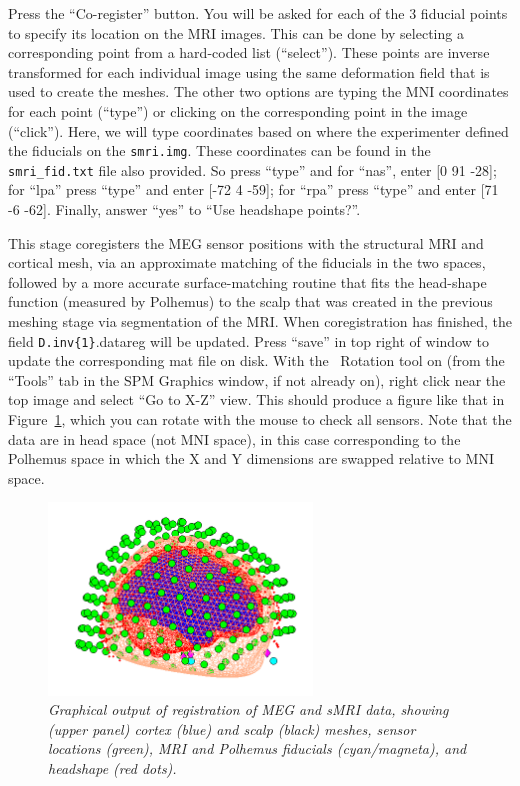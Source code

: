 Press the ``Co-register'' button. You will be asked for each of the 3 fiducial points to specify its location on the MRI images. This can be done by selecting a corresponding point from a hard-coded list (``select''). These points are inverse transformed for each individual image using the same deformation field that is used to create the meshes. The other two options are typing the MNI coordinates for each point (``type'') or clicking on the corresponding point in the image (``click''). Here, we will type coordinates based on where the experimenter defined the fiducials on the \texttt{smri.img}. These coordinates can be found in the \texttt{smri\_fid.txt} file also provided. So press ``type'' and for ``nas'', enter [0  91  -28]; for ``lpa'' press ``type'' and enter [-72   4  -59]; for ``rpa'' press ``type'' and enter [71  -6  -62]. Finally, answer ``yes'' to ``Use headshape points?''.

This stage coregisters the MEG sensor positions with the structural MRI and cortical mesh, via an approximate matching of the fiducials in the two spaces, followed by a more accurate surface-matching routine that fits the head-shape function (measured by Polhemus) to the scalp that was created in the previous meshing stage via segmentation of the MRI. When coregistration has finished, the field \texttt{D.inv\{1\}}.datareg will be updated. Press ``save'' in top right of window to update the corresponding mat file on disk. With the \matlab\ Rotation tool on (from the ``Tools'' tab in the SPM Graphics window, if not already on), right click near the top image and select ``Go to X-Z'' view. This should produce a figure like that in Figure~\ref{multimodal:fig:17}, which you can rotate with the mouse to check all sensors. Note that the data are in head space (not MNI space), in this case corresponding to the Polhemus space in which the X and Y dimensions are swapped relative to MNI space.

\begin{figure}
\begin{center}
\includegraphics[width=70mm]{multimodal/figures/meg_coreg.png}
\caption{\em  Graphical output of registration of MEG and sMRI data, showing (upper panel) cortex (blue) and scalp (black) meshes, sensor locations (green), MRI and Polhemus fiducials (cyan/magneta), and headshape (red dots).\label{multimodal:fig:17}}
\end{center}
\end{figure}

